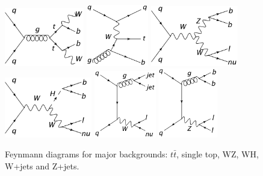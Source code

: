\begin{figure}[htbp]
	\centering
		\includegraphics[width=0.31\textwidth]{Figures/tt.png}
		\includegraphics[width=0.24\textwidth]{Figures/st.png}
		\includegraphics[width=0.34\textwidth]{WZ.png}
		\includegraphics[width=0.34\textwidth]{WH.png}		
		\includegraphics[width=0.24\textwidth]{Figures/Wj.png}
		\includegraphics[width=0.23\textwidth]{Zj.png}
		
	\caption[Feynmann diagrams showing major backgrounds]{Feynmann diagrams for major backgrounds: $t\bar{t}$, single top, WZ, WH, W+jets and Z+jets.}
	\label{fig:backgrounds}
\end{figure}

